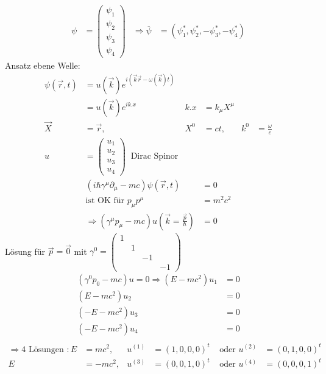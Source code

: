 	\begin{align*}
		\psi &=
		\begin{pmatrix}
			\psi_1 \\
			\psi_2 \\
			\psi_3 \\
			\psi_4
		\end{pmatrix}
		&\Rightarrow \overline{\psi} &=
		(\psi_1^*, \psi_2^*, -\psi_3^*, -\psi_4^*) 
	\end{align*}
Ansatz ebene Welle:
	\begin{align*}
		\psi (\vec{r}, t) &=
		u(\vec{k}) e^{i(\vec{k}\vec{r} - \omega(\vec{k}) t)} \\
		&= u(\vec{k}) e^{ik.x} 
		& k. x &= k_\mu X^\mu \\
		\vec{X} &= \vec{r} ,& X^0 &= ct,& k^0 &= \frac{\omega}{c} \\
		u &=
		\begin{pmatrix}
			u_1 \\
			u_2 \\
			u_3 \\
			u_4
		\end{pmatrix}
		~ \text{ Dirac Spinor}
	\end{align*}
	\begin{align*}
		\left(i \hbar \gamma^\mu \partial_\mu - mc\right)
		\psi(\vec{r}, t) &= 0 \\
		\text{ist OK für } p_\mu p^\mu &= m^2 c^2 \\
		\Rightarrow (\gamma^\mu p_\mu - mc) u \left(\vec{k} = \frac{\vec{p}}{\hbar}\right) &= 0 
	\end{align*}
Lösung für $\vec{p} = \vec{0}$ mit 
$ \gamma^0= \begin{pmatrix}
1 & & \\
& 1 && \\
&& -1 & \\
&&& -1 
\end{pmatrix}$
	\begin{align*}
		(\gamma^0 p_0 - mc) u = 0 \Rightarrow
		(E-mc^2) u_1 &= 0 \\
		(E-mc^2) u_2 &= 0 \\
		(-E-mc^2) u_3 &= 0 \\
		(-E-mc^2) u_4 &= 0 \\
	\end{align*}
	\begin{align*}
		\Rightarrow 4 \text{ Lösungen }: 
		E &= mc^2 ,& u^{(1)} &= (1, 0 ,0 ,0)^t &\text{ oder } 
		u^{(2)} &= (0,1,0,0)^t \\
		E &= -mc^2 ,& u^{(3)} &= (0, 0, 1, 0)^t &\text{ oder }
		u^{(4)} &= (0,0,0,1)^t
	\end{align*}
